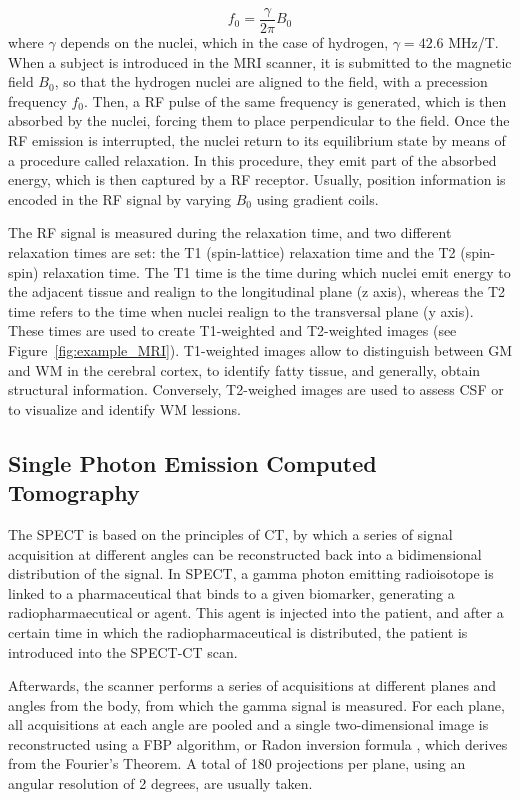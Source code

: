 \begin{equation}\label{eq:lamor}
f_0 = \frac{\gamma}{2\pi } B_0 
\end{equation}
where $\gamma$ depends on the nuclei, which in the case of hydrogen, $\gamma = 42.6$ MHz/T. When a subject is introduced in the \ac{MRI} scanner, it is submitted to the magnetic field $B_0$, so that the hydrogen nuclei are aligned to the field, with a precession frequency $f_0$. Then, a \ac{RF} pulse of the same frequency is generated, which is then absorbed by the nuclei, forcing them to place perpendicular to the field. Once the \ac{RF} emission is interrupted, the nuclei return to its equilibrium state by means of a procedure called relaxation. In this procedure, they emit part of the absorbed energy, which is then captured by a \ac{RF} receptor. Usually, position information is encoded in the \ac{RF} signal by varying $B_0$ using gradient coils. 

The \ac{RF} signal is measured during the relaxation time, and two different relaxation times are set: the T1 (spin-lattice) relaxation time and the T2 (spin-spin) relaxation time. The T1 time is the time during which nuclei emit energy to the adjacent tissue and realign to the longitudinal plane (z axis), whereas the T2 time refers to the time when nuclei realign to the transversal plane (y axis). These times are used to create T1-weighted and T2-weighted images (see Figure~\ref{fig:example_MRI}). T1-weighted images allow to distinguish between \ac{GM} and \ac{WM} in the cerebral cortex, to identify fatty tissue, and generally, obtain structural information. Conversely, T2-weighed images are used to assess \ac{CSF} or to visualize and identify \ac{WM} lessions. 

\subsection{Single Photon Emission Computed Tomography}
The \acf{SPECT} is based on the principles of \ac{CT}, by which a series of signal acquisition at different angles can be reconstructed back into a bidimensional distribution of the signal. In \ac{SPECT}, a gamma photon emitting radioisotope is linked to a pharmaceutical that binds to a given biomarker, generating a radiopharmaecutical or agent. This agent is injected into the patient, and after a certain time in which the radiopharmaceutical is distributed, the patient is introduced into the \ac{SPECT}-\ac{CT} scan. 

Afterwards, the scanner performs a series of acquisitions at different planes and angles from the body, from which the gamma signal is measured. For each plane, all acquisitions at each angle are pooled and a single two-dimensional image is reconstructed using a \ac{FBP} algorithm, or Radon inversion formula \cite{Herman2009l}, which derives from the Fourier's Theorem. A total of 180 projections per plane, using an angular resolution of 2 degrees, are usually taken. 

